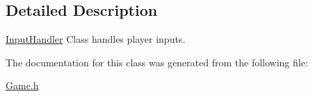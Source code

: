 \subsection{Detailed Description}
\mbox{\hyperlink{struct_input_handler}{Input\+Handler}} Class handles player inputs. 

The documentation for this class was generated from the following file\+:\begin{DoxyCompactItemize}
\item 
\mbox{\hyperlink{_game_8h}{Game.\+h}}\end{DoxyCompactItemize}

